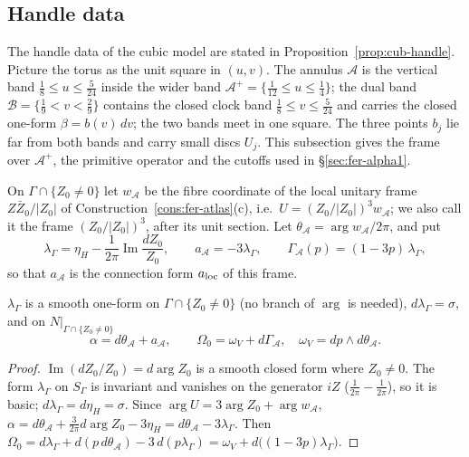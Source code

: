 \subsection{Handle data}\label{sec:fer-handle}

The handle data of the cubic model are stated in Proposition~\ref{prop:cub-handle}. Picture the torus as the unit
square in $(u,v)$. The annulus $\mathcal A$ is the vertical band $\frac18\le u\le\frac5{24}$ inside the wider band
$\mathcal A^+=\{\frac1{12}\le u\le\frac14\}$; the dual band $\mathcal B=\{\frac19<v<\frac29\}$ contains the closed clock band
$\frac18\le v\le\frac5{24}$ and carries the closed one-form $\beta=b(v)\,dv$; the two bands meet in one square. The three points $b_j$ lie far from both
bands and carry small discs $U_j$. This subsection gives the frame over $\mathcal A^+$, the primitive operator and the
cutoffs used in \S\ref{sec:fer-alpha1}.

\begin{definition}\label{def:fer-frame}
On $\Gamma\cap\{Z_0\ne0\}$ let $w_{\mathcal A}$ be the fibre coordinate of the local unitary frame $Z\bar Z_0/|Z_0|$ of
Construction~\ref{cons:fer-atlas}(c), i.e.\ $U=(Z_0/|Z_0|)^3w_{\mathcal A}$; we also call it the frame $(Z_0/|Z_0|)^3$, after its unit
section. Let $\theta_{\mathcal A}=\arg w_{\mathcal A}/2\pi$, and put
\[
 \lambda_\Gamma=\eta_H-\frac{1}{2\pi}\operatorname{Im}\frac{dZ_0}{Z_0},\qquad a_{\mathcal A}=-3\lambda_\Gamma,\qquad
 \Gamma_{\mathcal A}(p)=(1-3p)\,\lambda_\Gamma ,
\]
so that $a_{\mathcal A}$ is the connection form $a_{\rm loc}$ of this frame.
\end{definition}

\begin{lemma}\label{lem:fer-frame}
$\lambda_\Gamma$ is a smooth one-form on $\Gamma\cap\{Z_0\ne0\}$ (no branch of $\arg$ is needed), $d\lambda_\Gamma=\sigma$, and on
$N|_{\Gamma\cap\{Z_0\ne0\}}$
\[
 \alpha=d\theta_{\mathcal A}+a_{\mathcal A},\qquad \Omega_0=\omega_V+d\Gamma_{\mathcal A},\quad \omega_V=dp\wedge d\theta_{\mathcal A}.
\]
\end{lemma}

\begin{proof}
$\operatorname{Im}(dZ_0/Z_0)=d\arg Z_0$ is a smooth closed form where $Z_0\ne0$. The form $\lambda_\Gamma$ on $S_\Gamma$ is invariant and
vanishes on the generator $iZ$ ($\frac1{2\pi}-\frac1{2\pi}$), so it is basic; $d\lambda_\Gamma=d\eta_H=\sigma$. Since
$\arg U=3\arg Z_0+\arg w_{\mathcal A}$,
$\alpha=d\theta_{\mathcal A}+\frac{3}{2\pi}d\arg Z_0-3\eta_H=d\theta_{\mathcal A}-3\lambda_\Gamma$. Then
$\Omega_0=d\lambda_\Gamma+d(p\,d\theta_{\mathcal A})-3\,d(p\lambda_\Gamma)=\omega_V+d\big((1-3p)\lambda_\Gamma\big)$.
\end{proof}

